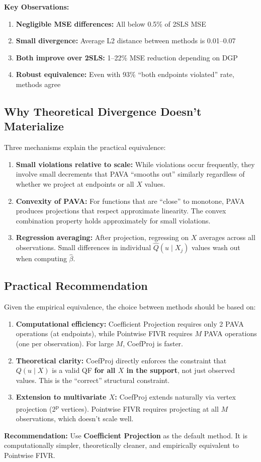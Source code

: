 \documentclass[12pt]{article}
\begin{document}
\textbf{Key Observations:}
\begin{enumerate}
\item \textbf{Negligible MSE differences:} All below 0.5\% of 2SLS MSE
\item \textbf{Small divergence:} Average L2 distance between methods is 0.01--0.07
\item \textbf{Both improve over 2SLS:} 1--22\% MSE reduction depending on DGP
\item \textbf{Robust equivalence:} Even with 93\% ``both endpoints violated'' rate, methods agree
\end{enumerate}

\subsection{Why Theoretical Divergence Doesn't Materialize}

Three mechanisms explain the practical equivalence:

\begin{enumerate}
\item \textbf{Small violations relative to scale:} While violations occur frequently, they involve small decrements that PAVA ``smooths out'' similarly regardless of whether we project at endpoints or all $X$ values.

\item \textbf{Convexity of PAVA:} For functions that are ``close'' to monotone, PAVA produces projections that respect approximate linearity. The convex combination property holds approximately for small violations.

\item \textbf{Regression averaging:} After projection, regressing on $X$ averages across all observations. Small differences in individual $\hat{Q}(u \mid X_j)$ values wash out when computing $\hat{\beta}$.
\end{enumerate}

\subsection{Practical Recommendation}

Given the empirical equivalence, the choice between methods should be based on:

\begin{enumerate}
\item \textbf{Computational efficiency:} Coefficient Projection requires only 2 PAVA operations (at endpoints), while Pointwise FIVR requires $M$ PAVA operations (one per observation). For large $M$, CoefProj is faster.

\item \textbf{Theoretical clarity:} CoefProj directly enforces the constraint that $Q(u \mid X)$ is a valid QF \textbf{for all $X$ in the support}, not just observed values. This is the ``correct'' structural constraint.

\item \textbf{Extension to multivariate $X$:} CoefProj extends naturally via vertex projection (2\textsuperscript{p} vertices). Pointwise FIVR requires projecting at all $M$ observations, which doesn't scale well.
\end{enumerate}

\textbf{Recommendation:} Use \textbf{Coefficient Projection} as the default method. It is computationally simpler, theoretically cleaner, and empirically equivalent to Pointwise FIVR.
\end{document}

